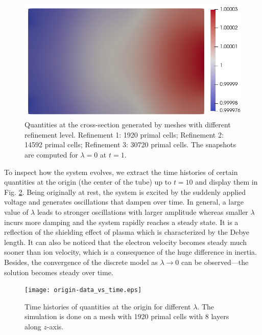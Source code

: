 \documentclass{article}
\begin{document}
\begin{figure}
    \includegraphics[scale=0.27]{slice_ni_T-1_lambda-0_32-3-4.png}
    \caption{Quantities at the cross-section generated by meshes with different refinement level. Refinement 1: 1920 primal cells; Refinement 2: 14592 primal cells; Refinement 3: 30720 primal cells. The snapshots are computed for $\lambda = 0$ at $t = 1$.}
    \label{fig:grid_study_3d_clip_lambda-0}
\end{figure}

To inspect how the system evolves, we extract the time histories of certain quantities at the origin (the center of the tube) up to $t = 10$ and display them in Fig. \ref{fig:origin-data_vs_time}. Being originally at rest, the system is excited by the suddenly applied voltage and generates oscillations that dampen over time. In general, a large value of $\lambda$ leads to stronger oscillations with larger amplitude whereas smaller $\lambda$ incurs more damping and the system rapidly reaches a steady state. It is a reflection of the shielding effect of plasma which is characterized by the Debye length. It can also be noticed that the electron velocity becomes steady much sooner than ion velocity, which is a consequence of the huge difference in inertia. Besides, the convergence of the discrete model as $\lambda \rightarrow 0$ can be observed---the solution becomes steady over time.
\begin{figure}
    \centering
    \texttt{[image: origin-data\_vs\_time.eps]}
    \caption{Time histories of quantities at the origin for different $\lambda$. The simulation is done on a mesh with 1920 primal cells with 8 layers along $z$-axis.}
    \label{fig:origin-data_vs_time}
\end{figure}
\end{document}
